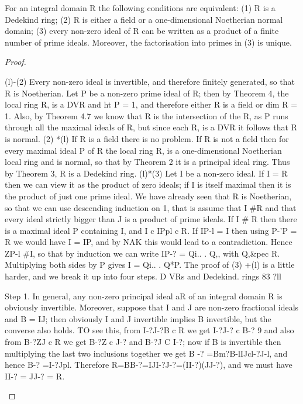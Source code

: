 \begin{theorem}[Theorem 11.6]\label{mcrt-auto-theorem-11-6}
\begin{mathematicalrecord}
For an integral domain R the following conditions are
equivalent:
   (1) R is a Dedekind ring;
   (2) R is either a field or a one-dimensional Noetherian normal domain;
   (3) every non-zero ideal of R can be written as a product of a finite
number of prime ideals.
    Moreover, the factorisation into primes in (3) is unique.
\end{mathematicalrecord}
\end{theorem}
\begin{proof}
\begin{mathematicalrecord}
(l)-(2)     Every non-zero ideal is invertible, and therefore finitely
generated, so that R is Noetherian. Let P be a non-zero prime ideal of R;
then by Theorem 4, the local ring R, is a DVR and ht P = 1, and therefore
either R is a field or dim R = 1. Also, by Theorem 4.7 we know that R is the
intersection of the R, as P runs through all the maximal ideals of R, but
since each R, is a DVR it follows that R is normal.
   (2) *(l) If R is a field there is no problem. If R is not a field then for every
maximal ideal P of R the local ring R, is a one-dimensional Noetherian
local ring and is normal, so that by Theorem 2 it is a principal ideal ring.
Thus by Theorem 3, R is a Dedekind ring.
   (l)*(3) Let I be a non-zero ideal. If I = R then we can view it as the
product of zero ideals; if I is itself maximal then it is the product of just one
prime ideal. We have already seen that R is Noetherian, so that we can use
descending induction on 1, that is assume that I #R and that every ideal
strictly bigger than J is a product of prime ideals. If I # R then there is a
maximal ideal P containing I, and I c IPpl c R. If IP-l = I then using
P-'P = R we would have I = IP, and by NAK this would lead to a
contradiction. Hence ZP-l #I, so that by induction we can write IP-? =
Qi.. . Q,, with Q,&pec R. Multiplying both sides by P gives I = Qi.. . Q*P.
   The proof of (3) +(l) is a little harder, and we break it up into four steps.
D VRs and Dedekind. rings                                           83
?ll

   Step 1. In general, any non-zero principal ideal aR of an integral domain
R is obviously invertible. Moreover, suppose that I and J are non-zero
fractional ideals and B = IJ; then obviously I and J invertible implies B
invertible, but the converse also holds. TO see this, from I-?J-?B    c R we
get I-?J-?   c B-? 9 and also from B-?ZJ c R we get B-?Z c J-? and
B-?J C I-?; now if B is invertible then multiplying the last two inclusions
together we get B -? =Bm?B-lIJcl-?J-l,            and hence B-? =I-?Jpl.
Therefore
         R=BB-?=IJI-?J-?=(II-?)(JJ-?),
and we must have II-?           = JJ-?   = R.


\end{mathematicalrecord}
\end{proof}
